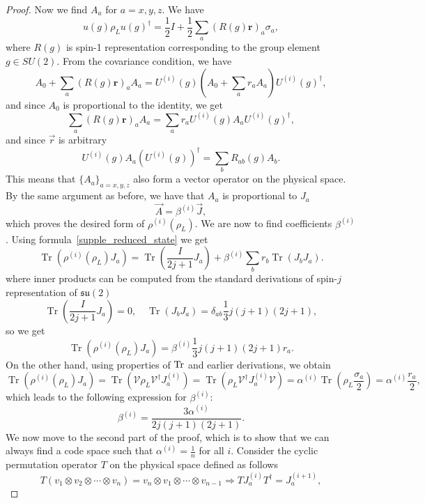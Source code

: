 \documentclass[11pt,letterpaper]{article}
\theoremstyle{plain}
\theoremstyle{plain}
\theoremstyle{plain}
\theoremstyle{plain}
\theoremstyle{plain}
\theoremstyle{plain}
\theoremstyle{plain}
\theoremstyle{definition}
\theoremstyle{plain}
\begin{document}
\begin{proof}
    Now we find $A_a$ for $a=x, y, z$. We have
    \[
    u(g) \rho_L u(g)^{\dagger}=\frac{1}{2} I+\frac{1}{2} \sum_a(R(g) \mathbf{r})_a \sigma_a,
    \]
    where $R(g)$ is spin-1 representation corresponding to the group element $g\in SU(2)$. From the covariance condition, we have
    \[
    A_0+\sum_a(R(g) \mathbf{r})_a A_a=U^{(i)}(g)\left(A_0+\sum_a r_a A_a\right) U^{(i)}(g)^{\dagger},
    \]
    and since $A_0$ is proportional to the identity, we get
    \[
    \sum_a(R(g) \mathbf{r})_a A_a=\sum_a r_a U^{(i)}(g) A_a U^{(i)}(g)^{\dagger},
    \]
    and since $\vec{r}$ is arbitrary
    \[
    U^{(i)}(g) A_a (U^{(i)}(g))^{\dagger}=\sum_b R_{a b}(g) A_b.
    \]
    This means that $\{A_a\}_{a=x, y, z}$ also form a vector operator on the physical space.
    By the same argument as before, we have that $A_a$ is proportional to $J_a$
    \[
    \vec{A}=\beta^{(i)} \vec{J},
    \] 
    which proves the desired form of $\rho^{(i)}\left(\rho_L\right)$. We are now to find coefficients $\beta^{(i)}$. 
    Using formula~\eqref{supple_reduced_state} we get
    \[
    \operatorname{Tr}\left(\rho^{(i)}\left(\rho_L\right) J_a\right)=\operatorname{Tr}\left(\frac{I}{2 j+1} J_a\right)+\beta^{(i)} \sum_b r_b \operatorname{Tr}\left(J_b J_a\right).
    \]
    where inner products can be computed from the standard derivations of spin-$j$ representation of $\mathfrak{su}(2)$
    \[
    \operatorname{Tr}\left(\frac{I}{2 j+1} J_a\right)=0, \quad \operatorname{Tr}\left(J_b J_a\right)=\delta_{a b} \frac{1}{3} j(j+1)(2 j+1),
    \]
    so we get
    \[
    \operatorname{Tr}\left(\rho^{(i)}\left(\rho_L\right) J_a\right)=\beta^{(i)} \frac{1}{3} j(j+1)(2 j+1) r_a .
    \]
    On the other hand, using properties of $\Tr$ and earlier derivations, we obtain
    \[
    \operatorname{Tr}\left(\rho^{(i)}\left(\rho_L\right) J_a\right)=\operatorname{Tr}\left(\mathcal{V} \rho_L \mathcal{V}^{\dagger} J_a^{(i)}\right)=\operatorname{Tr}\left(\rho_L \mathcal{V}^{\dagger} J_a^{(i)} \mathcal{V}\right)=\alpha^{(i)} \operatorname{Tr}\left(\rho_L \frac{\sigma_a}{2}\right)=\alpha^{(i)} \frac{r_a}{2},
    \]
    which leads to the following expression for $\beta^{(i)}$:
    \[
    \beta^{(i)}=\frac{3 \alpha^{(i)}}{2 j(j+1)(2 j+1)} .
    \]
    We now move to the second part of the proof, which is to show that we can always find a code space such that $\alpha^{(i)} = \frac{1}{n}$ for all $i$.
    Consider the cyclic permutation operator $T$ on the physical space defined as follows
    \[
        T\left(v_1 \otimes v_2 \otimes \cdots \otimes v_n\right)=v_n \otimes v_1 \otimes \cdots \otimes v_{n-1} \Longrightarrow T J_a^{(i)} T^{\dagger}=J_a^{(i+1)},
\]
\end{proof}
\end{document}
